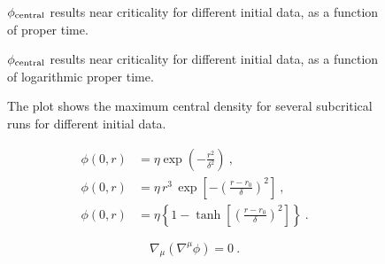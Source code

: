 \documentclass[a4paper,11pt]{article}
\renewcommand{\d}{\delta}
\newcommand{\lrpar}[1]{\left( #1 \right)}
\newcommand{\lrsquare}[1]{\left[ #1 \right]}
\newcommand{\lrcurly}[1]{\left\{ #1 \right\}}
\newcommand{\al}[1]{
  \begin{align}
    #1
  \end{align}
}
\begin{document}
\begin{figure}[H]
  \centering
  
  \caption[$\phi_{\rm central}$ results near criticality for different initial data, as a function of proper time.]{$\phi_{\rm central}$ results near criticality for different initial data, as a function of proper time.}
  \label{fig:accumulation_tau_combined}
\end{figure}

\setlength{\abovecaptionskip}{16pt plus 0pt minus 0pt}

\begin{figure}[H]
  \centering
  
  \caption[$\phi_{\rm central}$ results near criticality for different initial data, as a function of logarithmic proper time.]{$\phi_{\rm central}$ results near criticality for different initial data, as a function of logarithmic proper time.}
  \label{fig:accumulation_Lambda_combined}
\end{figure}

\setlength{\abovecaptionskip}{10pt plus 0pt minus 0pt}

\begin{figure}[H]
  \centering
  
  \caption[Central energy density near criticality for different initial data.]{The plot shows the maximum central density for several subcritical runs for different initial data.}
  \label{fig:critical_exponent}
\end{figure}

\al{
  \phi(0,r) &= \eta\exp\lrpar{-\frac{r^{2}}{\d^{2}}}\ ,\label{eq:ic_1}\\
  \phi(0,r) &= \eta\,r^{3}\,\exp\lrsquare{-\lrpar{\frac{r-r_{0}}{\d}}^{2}}\ ,\label{eq:ic_2}\\
  \phi(0,r) &= \eta\lrcurly{1 - \tanh\lrsquare{\lrpar{\frac{r-r_{0}}{\d}}^{2}}}\ .\label{eq:ic_3}
}

$$
\nabla_{\mu}\lrpar{\nabla^{\mu}\phi}=0\ .
$$

\clearpage
{}
\printbibliography
\end{document}
